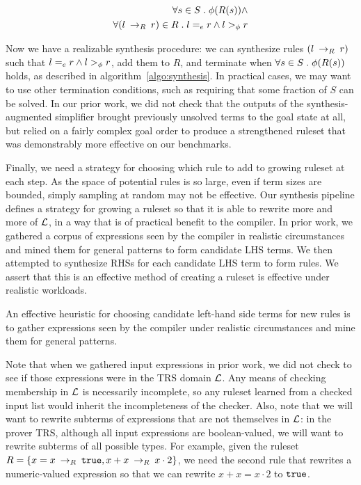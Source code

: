 \begin{align*}
    \forall s \in S \;.\; \phi(R(s)) \wedge \\
    \forall (l \:\rightarrow_{R}\: r) \in R \;.\; l =_e r \wedge l >_{\phi} r
\end{align*}

Now we have a realizable synthesis procedure: we can synthesize rules $(l \:\rightarrow_{R}\: r)$ such that $l =_e r \wedge l >_{\phi} r$, add them to $R$, and terminate when $\forall s \in S \;.\; \phi(R(s))$ holds, as described in algorithm~\ref{algo:synthesis}. In practical cases, we may want to use other termination conditions, such as requiring that some fraction of $S$ can be solved. In our prior work, we did not check that the outputs of the synthesis-augmented simplifier brought previously unsolved terms to the goal state at all, but relied on a fairly complex goal order to produce a strengthened ruleset that was demonstrably more effective on our benchmarks.

Finally, we need a strategy for choosing which rule to add to growing ruleset at each step. As the space of potential rules is so large, even if term sizes are bounded, simply sampling at random may not be effective. Our synthesis pipeline defines a strategy for growing a ruleset so that it is able to rewrite more and more of $\mathcal{L}$, in a way that is of practical benefit to the compiler. In prior work, we gathered a corpus of expressions seen by the compiler in realistic circumstances and mined them for general patterns to form candidate LHS terms. We then attempted to synthesize RHSs for each candidate LHS term to form rules. We assert that this is an effective method of creating a ruleset is effective under realistic workloads.

\begin{assumption}
An effective heuristic for choosing candidate left-hand side terms for new rules is to gather expressions seen by the compiler under realistic circumstances and mine them for general patterns.
\end{assumption}

Note that when we gathered input expressions in prior work, we did not check to see if those expressions were in the TRS domain $\mathcal{L}$. Any means of checking membership in $\mathcal{L}$ is necessarily incomplete, so any ruleset learned from a checked input list would inherit the incompleteness of the checker. Also, note that we will want to rewrite subterms of expressions that are not themselves in $\mathcal{L}$: in the prover TRS, although all input expressions are boolean-valued, we will want to rewrite subterms of all possible types. For example, given the ruleset $R = \{x = x \:\rightarrow_{R}\: \texttt{true}, x + x \:\rightarrow_{R}\: x \cdot 2\}$, we need the second rule that rewrites a numeric-valued expression so that we can rewrite $x + x = x \cdot 2$ to $\texttt{true}$.

